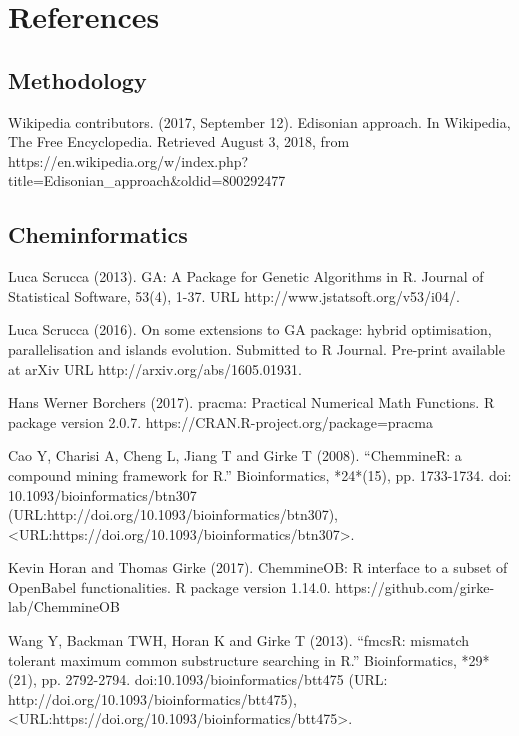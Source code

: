\section{References}

\subsection{Methodology}

Wikipedia contributors. (2017, September 12). 
\newblock Edisonian approach. 
\newblock In Wikipedia, The Free Encyclopedia. Retrieved August 3, 2018, from  https://en.wikipedia.org/w/index.php?title=Edisonian_approach&oldid=800292477

\subsection{Cheminformatics}

Luca Scrucca (2013). 
\newblock GA: A Package for Genetic Algorithms in R. 
\newblock Journal of Statistical Software, 53(4), 1-37. URL http://www.jstatsoft.org/v53/i04/.

Luca Scrucca (2016). 
\newblock On some extensions to GA package: hybrid optimisation, parallelisation and islands evolution. Submitted to R Journal. 
\newblock Pre-print available at arXiv URL http://arxiv.org/abs/1605.01931.

Hans Werner Borchers (2017). 
\newblock pracma: Practical Numerical Math Functions. 
\newblock R package version 2.0.7. https://CRAN.R-project.org/package=pracma

Cao Y, Charisi A, Cheng L, Jiang T and Girke T (2008). 
\newblock “ChemmineR: a compound mining framework for R.”
\newblock Bioinformatics, *24*(15), pp. 1733-1734. doi: 10.1093/bioinformatics/btn307 (URL:http://doi.org/10.1093/bioinformatics/btn307), <URL:https://doi.org/10.1093/bioinformatics/btn307>.

Kevin Horan and Thomas Girke (2017). 
\newblock ChemmineOB: R interface to a subset of OpenBabel functionalities. 
\newblock R package version 1.14.0. https://github.com/girke-lab/ChemmineOB

 Wang Y, Backman TWH, Horan K and Girke T (2013). 
\newblock “fmcsR: mismatch tolerant maximum common substructure searching in R.” 
\newblock Bioinformatics, *29*(21), pp. 2792-2794. doi:10.1093/bioinformatics/btt475 (URL: http://doi.org/10.1093/bioinformatics/btt475), <URL:https://doi.org/10.1093/bioinformatics/btt475>.

